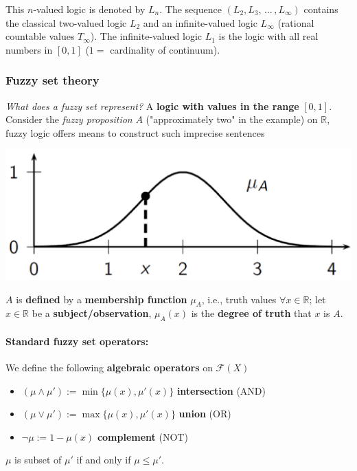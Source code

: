 This $n$-valued logic is denoted by $L_n$. The sequence $(L_2, L_3, \, \dots \, , L_{\infty})$ contains the classical two-valued logic $L_2$ and an infinite-valued logic $L_{\infty}$ (rational countable values $T_{\infty}$). The infinite-valued logic $L_1$ is the logic with all real numbers in $[0, 1]$ ($1=$ cardinality of continuum).

\newpage

\subsubsection{Fuzzy set theory}

\textit{What does a fuzzy set represent?} A \textbf{logic with values in the range} $[0,1]$. \\

Consider the \textit{fuzzy proposition} $A$ ("approximately two" in the example) on $\mathbb{R}$, fuzzy logic offers means to construct such imprecise sentences

\begin{center}
	\includegraphics[width=0.6\columnwidth]{img/FS/appr2}
\end{center}

$A$ is \textbf{defined} by a \textbf{membership function} $\mu_A$, i.e., truth values $\forall x \in \mathbb{R}$; let $x \in \mathbb{R}$ be a \textbf{subject/observation}, $\mu_A (x)$ is the \textbf{degree of truth} that $x$ is $A$.\\

\paragraph{Standard fuzzy set operators:} We define the following \textbf{algebraic operators} on $\mathcal{F} (X)$ 
\begin{itemize}
	\item $(\mu \wedge \mu') := \min \{\mu(x), \mu' (x)\}$ \textbf{intersection} (AND)
	\item $(\mu \vee \mu') := \max \{\mu(x), \mu' (x)\}$ \textbf{union} (OR)
	\item $\neg \mu := 1 - \mu (x)$ \textbf{complement} (NOT)
\end{itemize}
$\mu$ is subset of $\mu'$ if and only if $\mu \leq \mu'$.\\

